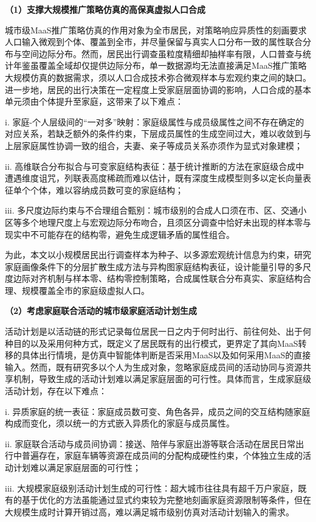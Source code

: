 \textbf{（1）支撑大规模推广策略仿真的高保真虚拟人口合成}

城市级MaaS推广策略仿真的作用对象为全市居民，对策略响应异质性的刻画要求人口输入微观到个体、覆盖到全市，并尽量保留与真实人口分布一致的属性联合分布与空间边际分布。然而，居民出行调查虽粒度精细却抽样率有限，人口普查与统计年鉴虽覆盖全域却仅提供边际分布，单一数据源均无法直接满足MaaS推广策略大规模仿真的数据需求，须以人口合成技术弥合微观样本与宏观约束之间的缺口。进一步地，居民的出行决策在一定程度上受家庭层面协调的影响，人口合成的基本单元须由个体提升至家庭，这带来了以下难点：

i. 家庭-个人层级间的``一对多''映射：家庭级属性与成员级属性之间不存在确定的对应关系，若缺乏额外的条件约束，下层成员属性的生成空间过大，难以收敛到与上层家庭属性协调一致的组合，夫妻、亲子等成员关系亦须作为显式对象建模；

ii. 高维联合分布拟合与可变家庭结构表征：基于统计推断的方法在家庭级合成中遭遇维度诅咒，列联表高度稀疏而难以估计，既有深度生成模型则多以定长向量表征单个个体，难以容纳成员数可变的家庭结构；

iii. 多尺度边际约束与不合理组合甄别：城市级别的合成人口须在市、区、交通小区等多个地理尺度上与宏观边际分布吻合，且须区分调查中恰好未出现的样本零与现实中不可能存在的结构零，避免生成逻辑矛盾的属性组合。

为此，本文以小规模居民出行调查样本为种子、以多源宏观统计信息为约束，研究家庭画像条件下的分层扩散生成方法与异构图家庭结构表征，设计能量引导的多尺度边际对齐机制与样本零、结构零控制策略，合成属性联合分布真实、家庭结构合理、规模覆盖全市的家庭级虚拟人口。

\textbf{（2）考虑家庭联合活动的城市级家庭活动计划生成}

活动计划是以活动链的形式记录每位居民一日之内于何时出行、前往何处、出于何种目的以及采用何种方式，既定义了居民既有的出行模式，更界定了其向MaaS转移的具体出行情境，是仿真中智能体判断是否采用MaaS以及如何采用MaaS的直接输入。然而，既有研究多以个人为生成对象，忽略家庭成员间的活动协同与资源共享机制，导致生成的活动计划难以满足家庭层面的可行性。具体而言，生成家庭级活动计划，存在以下难点：

i. 异质家庭的统一表征：家庭成员数可变、角色各异，成员之间的交互结构随家庭构成而变化，须以统一的方式嵌入异质化的家庭与成员属性。

ii. 家庭联合活动与成员间协调：接送、陪伴与家庭出游等联合活动在居民日常出行中普遍存在，家庭车辆等资源在成员间的分配构成硬性约束，个体独立生成的活动计划难以满足家庭层面的可行性；

iii. 大规模家庭级别活动计划生成的可行性：超大城市往往具有超千万户家庭，既有的基于优化的方法虽能通过显式约束较为完整地刻画家庭资源限制等条件，但在大规模生成时计算开销过高，难以满足城市级别仿真对活动计划输入的需求。

